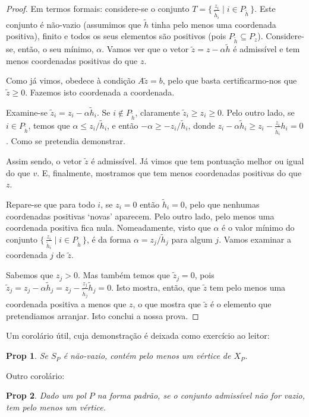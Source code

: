 \documentclass{article}
\newtheorem{prop}{Prop}
\theoremstyle{definition}
\begin{document}
\begin{proof}
	Em termos formais: considere-se o conjunto $T = \{\,\frac {z_i} {\tilde h_i} \mid i \in P_{\tilde h}\,\}$. Este conjunto é não-vazio (assumimos que $\tilde h$ tinha pelo menos uma coordenada positiva), finito e todos os seus elementos são positivos (pois $P_{\tilde h} \subseteq P_z$). Considere-se, então, o seu mínimo, $\alpha$. Vamos ver que o vetor $\tilde z = z - \alpha \tilde h$ é admissível e tem menos coordenadas positivas do que $z$.
	
	Como já vimos, obedece à condição $A \tilde z = b$, pelo que basta certificarmo-nos que $\tilde z \geq 0$. Fazemos isto coordenada a coordenada.
	
	Examine-se $\tilde z_i = z_i - \alpha \tilde h_i$. Se $i \not \in P_{\tilde h}$, claramente $\tilde z_i \geq z_i \geq 0$. Pelo outro lado, se $i \in P_{\tilde h}$, temos que $\alpha \leq z_i/\tilde h_i$, e então $-\alpha \geq -z_i/\tilde h_i$, donde $z_i - \alpha \tilde h_i \geq z_i - \frac {z_i}{\tilde h_i} h_i = 0$. Como se pretendia demonstrar.
	
	Assim sendo, o vetor $\tilde z$ é admissível. Já vimos que tem pontuação melhor ou igual do que $v$. E, finalmente, mostramos que tem menos coordenadas positivas do que $z$.
	
	Repare-se que para todo $i$, se $z_i = 0$ então $\tilde h_i = 0$, pelo que nenhumas coordenadas positivas `novas' aparecem. Pelo outro lado, pelo menos uma coordenada positiva fica nula. Nomeadamente, visto que $\alpha$ é o valor mínimo do conjunto $\{\,\frac {z_i} {\tilde h_i} \mid i \in P_{\tilde h}\,\}$, é da forma $\alpha = z_j / \tilde h_j$ para algum $j$. Vamos examinar a coordenada $j$ de $\tilde z$.
	
	Sabemos que $z_j > 0$. Mas também temos que $\tilde z_j = 0$, pois $\tilde z_j = z_j - \alpha \tilde h_j = z_j - \frac {z_j}{\tilde h_j} \tilde h_j = 0$. Isto mostra, então, que $\tilde z$ tem pelo menos uma coordenada positiva a menos que $z$, o que mostra que $\tilde z$ é o elemento que pretendiamos arranjar. Isto conclui a nossa prova.
	\end{proof}
	
	Um corolário útil, cuja demonstração é deixada como exercício ao leitor:
	
	\begin{prop}
	Se $S_P$ é não-vazio, contém pelo menos um vértice de $X_P$.
	\end{prop}
	
	Outro corolário:
	
	\begin{prop}
	Dado um pol $P$ na forma padrão, se o conjunto admissível não for vazio, tem pelo menos um vértice.
	\end{prop}
	
\end{document}
